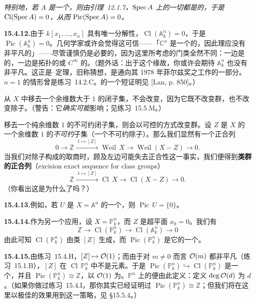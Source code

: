 \emph{特别地，若 $A$ 是一个\trUFD，则由\mbox{引理~12.1.7}，$\operatorname{Spec} A$ 上的一切\trWeilDivisor{}都是\trPrincipal{}的，于是 $\operatorname{Cl}(\operatorname{Spec} A)=0$，从而 $\operatorname{Pic}(\operatorname{Spec} A)=0$。}

\textbf{15.4.12.}\quad 由于 $k[x_1,\dots,x_n]$ 具有唯一分解性，$\operatorname{Cl}(\mathbb{A}^n_k)=0$，于是 $\boxed{\operatorname{Pic}(\mathbb{A}^n_k)=0}$。几何学家或许会觉得这可信——「$\mathbb{C}^n$ 是一个\trContractible{}的\trComplex\trManifold，因此理应没有非平凡的\trLineBundle」——尽管谨慎仍是必要的，因为这里所考虑的\trLineBundle{}门类全然不同：一边是\trHolomorphic{}的，一边是拓扑的或 $C^{\infty}$ 的。（题外话：出于这个缘故，你或许会期待 $\mathbb{A}^n_k$ 也没有非平凡\trVectorBundle。这正是\trQuillen--\trSuslin{}定理，旧称\trSerre{}猜想，是\trQuillen{}通向其 1978 年菲尔兹奖之工作的一部分。$n=1$ 的情形曾是\mbox{练习~14.2.C}。\trVaserstein{}的一个短证明见 [Lan, p. 850]。）

从 $X$ 中移去一个余维数大于 $1$ 的闭子集，不会改变\trClassGroup，因为它既不改变\trWeilDivisor{}群，也不改变\trPrincipal{}除子。（警告：它\emph{确实可能}影响\trPicardGroup；见\mbox{练习~15.5.M}。）

移去一个纯余维数 $1$ 的不可约闭子集，则会以可控的方式改变\trWeilDivisor{}群。设 $Z$ 是 $X$ 的一个余维数 $1$ 的\emph{不可约}子集（一个不可约除子）。那么我们显然有一个正合列
\[
0\longrightarrow\mathbb{Z}\xrightarrow{\;1\mapsto[Z]\;}\operatorname{Weil}\,X\longrightarrow\operatorname{Weil}(X-Z)\longrightarrow 0.
\]
当我们对\trPrincipal{}除子构成的\trSubgroup{}取商时，顾及左边可能失去正合性这一事实，我们便得到\textbf{类群的\trExcision{}正合列}（excision exact sequence for class groups）
\begin{equation*}\tag{15.4.12.1}\label{eq:excision-class-groups}
\mathbb{Z}\xrightarrow{\;1\mapsto[Z]\;}\operatorname{Cl}\,X\longrightarrow\operatorname{Cl}(X-Z)\longrightarrow 0.
\end{equation*}
（你看出这是为什么了吗？）

\textbf{15.4.13.}\quad 例如，若 $U$ 是 $X=\mathbb{A}^n$ 的一个\trOpenSubscheme，则 $\operatorname{Pic}\,U=\{0\}$。

\textbf{15.4.14.}\quad 作为另一个应用，设 $X=\mathbb{P}^n_k$，而 $Z$ 是超平面 $x_0=0$。我们有
\[
\mathbb{Z}\longrightarrow\operatorname{Cl}(\mathbb{P}^n_k)\longrightarrow\operatorname{Cl}(\mathbb{A}^n_k)\longrightarrow 0
\]
由此可知 $\operatorname{Cl}(\mathbb{P}^n_k)$ 由类 $[Z]$ 生成，而 $\operatorname{Pic}(\mathbb{P}^n_k)$ 是它的一个\trSubgroup。

\textbf{15.4.15.}\quad 由\mbox{练习~15.4.H}，$[Z]\mapsto\mathcal{O}(1)$；而由于对 $m\ne 0$ 而言 $\mathcal{O}(m)$ 都非平凡（\mbox{练习~15.1.B}），$[Z]$ 在 $\operatorname{Cl}\,\mathbb{P}^n_k$ 中不是\trTorsion{}元素。于是 $\operatorname{Pic}(\mathbb{P}^n_k)\hookrightarrow\operatorname{Cl}(\mathbb{P}^n_k)$ 是一个\trIsomorphism，并且 $\boxed{\operatorname{Pic}(\mathbb{P}^n_k)\cong\mathbb{Z}}$，以 $\mathcal{O}(1)$ 为\trGenerator。$\mathbb{P}^n$ 上\trInvertibleSheaf{}的\textbf{\trDegree}便由此定义：定义 $\deg\mathcal{O}(d)$ 为 $d$。（如果你做过\mbox{练习~15.4.I}，那你其实已经证明过 $\operatorname{Pic}(\mathbb{P}^n_k)\cong\mathbb{Z}$；但我们将在这里以极佳的效果用到这一策略，见 \S15.5.4。）

